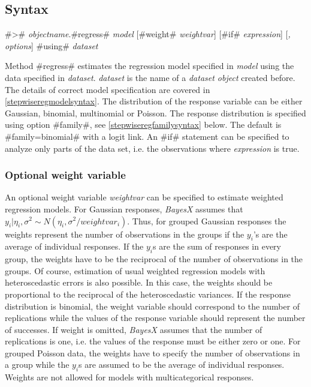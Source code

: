 \subsection{Syntax}
\label{stepwiseregregresssyntax}

#># {\em objectname}.#regress# {\em model} [#weight# {\em weightvar}] [#if# {\em expression}] [{\em , options}] #using# {\em dataset}

Method #regress# estimates the regression model specified in {\em
model} using the data specified in {\em dataset}. {\em dataset} is
the name of a {\em dataset object} created before. The details
of correct model specification are covered in
\autoref{stepwiseregmodelsyntax}. The distribution of the response
variable can be either Gaussian, binomial, multinomial or Poisson.
The response distribution is specified using
option #family#, see \autoref{stepwiseregfamilysyntax} below. The
default is #family=binomial# with a logit link. An #if# statement
can be specified to analyze only parts of the data set, i.e. the
observations where {\em expression} is true.

\subsubsection{Optional weight variable}
\label{stepwiseregweightspecification}

An optional weight variable {\em weightvar} can be specified to
estimate weighted regression models. For Gaussian responses, {\em
BayesX} assumes that $y_i|\eta_i,\sigma^2 \sim
N(\eta_i,\sigma^2/weightvar_i)$. Thus, for grouped Gaussian
responses the weights represent the number of observations in the
groups if the $y_i$'s are the average of individual responses. If
the $y_i$s are the sum of responses in every group, the weights have
to be the reciprocal of the number of observations in the groups. Of
course, estimation of usual weighted regression models with
heteroscedastic errors is also possible. In this case, the weights
should be proportional to the reciprocal of the heteroscedastic
variances. If the response distribution is binomial, the weight
variable should correspond to the number of replications while the
values of the response variable should represent the number of
successes. If weight is omitted, {\em BayesX} assumes that the
number of replications is one, i.e. the values of the response must
be either zero or one. For grouped Poisson data, the weights have to
specify the number of observations in a group while the $y_i$s are
assumed to be the average of individual responses. Weights are not
allowed for models with multicategorical responses.

